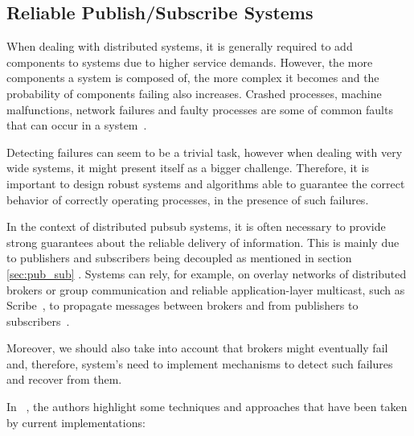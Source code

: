 \subsection{Reliable Publish/Subscribe Systems}
\label{sec:reliable_pub_sub_systems}

When dealing with distributed systems, it is generally required to add components to systems due to higher service demands. However, the more components a system is composed of, the more complex it becomes and the probability of components failing also increases. Crashed processes, machine malfunctions, network failures and faulty processes are some of common faults that can occur in a system~\cite{fault-tolerance-distributed-systems}. 

Detecting failures can seem to be a trivial task, however when dealing with very wide systems, it might present itself as a bigger challenge. Therefore, it is important to design robust systems and algorithms able to guarantee the correct behavior of correctly operating processes, in the presence of such failures. 

In the context of distributed \gls{pubsub} systems, it is often necessary to provide strong guarantees about the reliable delivery of information. This is mainly due to publishers and subscribers being decoupled as mentioned in section \ref{sec:pub_sub} . Systems can rely, for example, on overlay networks of distributed brokers or group communication and reliable application-layer multicast, such as Scribe~\cite{scribe}, to propagate messages between brokers and from publishers to subscribers~\cite{faces-of-pub-sub}.

Moreover, we should also take into account that brokers might eventually fail and, therefore, system's need to implement mechanisms to detect such failures and recover from them.


In ~\cite{tutorial-on-reliability-in-pubsub}, the authors highlight some techniques and approaches that have been taken by current implementations:

